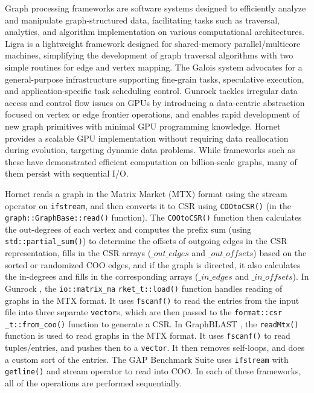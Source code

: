 Graph processing frameworks are software systems designed to efficiently analyze and manipulate graph-structured data, facilitating tasks such as traversal, analytics, and algorithm implementation on various computational architectures. Ligra \cite{shun2013ligra} is a lightweight framework designed for shared-memory parallel/multicore machines, simplifying the development of graph traversal algorithms with two simple routines for edge and vertex mapping. The Galois system \cite{nguyen2013lightweight} advocates for a general-purpose infrastructure supporting fine-grain tasks, speculative execution, and application-specific task scheduling control. Gunrock \cite{wang2016gunrock} tackles irregular data access and control flow issues on GPUs by introducing a data-centric abstraction focused on vertex or edge frontier operations, and enables rapid development of new graph primitives with minimal GPU programming knowledge. Hornet \cite{busato2018hornet} provides a scalable GPU implementation without requiring data reallocation during evolution, targeting dynamic data problems. While frameworks such as these have demonstrated efficient computation on billion-scale graphs, many of them persist with sequential I/O.

Hornet \cite{busato2018hornet} reads a graph in the Matrix Market (MTX) format using the stream operator on \texttt{ifstream}, and then converts it to CSR using \texttt{COOtoCSR()} (in the \texttt{graph::GraphBase::read()} function). The \texttt{COOtoCSR()} function then calculates the out-degrees of each vertex and computes the prefix sum (using \texttt{std::partial\_sum()}) to determine the offsets of outgoing edges in the CSR representation, fills in the CSR arrays ($\_out\_edges$ and $\_out\_offsets$) based on the sorted or randomized COO edges, and if the graph is directed, it also calculates the in-degrees and fills in the corresponding arrays ($\_in\_edges$ and $\_in\_offsets$). In Gunrock \cite{wang2016gunrock}, the \texttt{io::matrix\_ma} \texttt{rket\_t::load()} function handles reading of graphs in the MTX format. It uses \texttt{fscanf()} to read the entries from the input file into three separate \texttt{vector}s, which are then passed to the \texttt{format::csr} \texttt{\_t::from\_coo()} function to generate a CSR. In GraphBLAST \cite{yang2022graphblast}, the \texttt{readMtx()} function is used to read graphs in the MTX format. It uses \texttt{fscanf()} to read tuples/entries, and pushes then to a \texttt{vector}. It then removes self-loops, and does a custom sort of the entries. The GAP Benchmark Suite \cite{beamer2015gap} uses \texttt{ifstream} with \texttt{getline()} and stream operator to read into COO. In each of these frameworks, all of the operations are performed sequentially.

